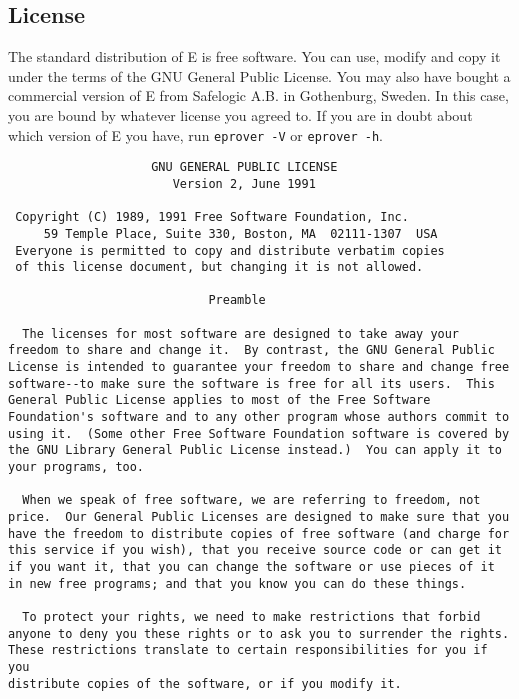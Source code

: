 \documentclass{article}
\begin{document}
\clearpage
\begin{appendix}
  \section{License}
  
  The standard distribution of E is free software. You can use, modify
  and copy it under the terms of the GNU General Public License. You
  may also have bought a commercial version of E from Safelogic
  A.B. in Gothenburg, Sweden. In this case, you are bound by whatever
  license you agreed to. If you are in doubt about which version of E
  you have, run \texttt{eprover -V} or \texttt{eprover -h}.

\small
\begin{verbatim}
                    GNU GENERAL PUBLIC LICENSE
                       Version 2, June 1991

 Copyright (C) 1989, 1991 Free Software Foundation, Inc.
     59 Temple Place, Suite 330, Boston, MA  02111-1307  USA
 Everyone is permitted to copy and distribute verbatim copies
 of this license document, but changing it is not allowed.

                            Preamble

  The licenses for most software are designed to take away your
freedom to share and change it.  By contrast, the GNU General Public
License is intended to guarantee your freedom to share and change free
software--to make sure the software is free for all its users.  This
General Public License applies to most of the Free Software
Foundation's software and to any other program whose authors commit to
using it.  (Some other Free Software Foundation software is covered by
the GNU Library General Public License instead.)  You can apply it to
your programs, too.

  When we speak of free software, we are referring to freedom, not
price.  Our General Public Licenses are designed to make sure that you
have the freedom to distribute copies of free software (and charge for
this service if you wish), that you receive source code or can get it
if you want it, that you can change the software or use pieces of it
in new free programs; and that you know you can do these things.

  To protect your rights, we need to make restrictions that forbid
anyone to deny you these rights or to ask you to surrender the rights.
These restrictions translate to certain responsibilities for you if you
distribute copies of the software, or if you modify it.


\end{verbatim}
\end{appendix}
\end{document}

